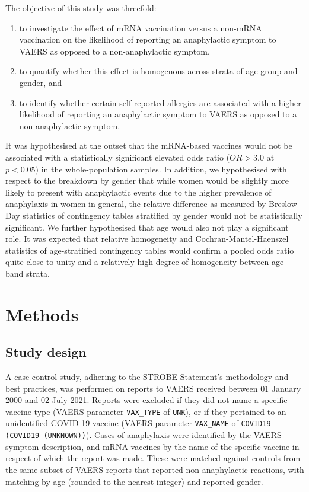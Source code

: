 \documentclass{article}
\begin{document}
The objective of this study was threefold:

\begin{enumerate}
    \item to investigate the effect of mRNA vaccination versus a non-mRNA vaccination on the likelihood of reporting an anaphylactic symptom to VAERS as opposed to a non-anaphylactic symptom,
    \item to quantify whether this effect is homogenous across strata of age group and gender, and
    \item to identify whether certain self-reported allergies are associated with a higher likelihood of reporting an anaphylactic symptom to VAERS as opposed to a non-anaphylactic symptom.
\end{enumerate}

It was hypothesised at the outset that the mRNA-based vaccines would not be associated with a statistically significant elevated odds ratio ($OR > 3.0$ at $p < 0.05$) in the whole-population samples.
In addition, we hypothesised with respect to the breakdown by gender that while women would be slightly more likely to present with anaphylactic events due to the higher prevalence of anaphylaxis in women in general,\cite{salvati2019gender} the relative difference as measured by Breslow-Day statistics of contingency tables stratified by gender would not be statistically significant.
We further hypothesised that age would also not play a significant role.
It was expected that relative homogeneity and Cochran-Mantel-Haenszel statistics of age-stratified contingency tables would confirm a pooled odds ratio quite close to unity and a relatively high degree of homogeneity between age band strata.


\section{Methods}

\subsection{Study design}

A case-control study, adhering to the STROBE Statement's methodology and best practices,\cite{von2014strengthening} was performed on reports to VAERS received between 01 January 2000 and 02 July 2021.
Reports were excluded if they did not name a specific vaccine type (VAERS parameter \texttt{VAX\_TYPE} of \texttt{UNK}), or if they pertained to an unidentified COVID-19 vaccine (VAERS parameter \texttt{VAX\_NAME} of \texttt{COVID19 (COVID19 (UNKNOWN))}).
Cases of anaphylaxis were identified by the VAERS symptom description, and mRNA vaccines by the name of the specific vaccine in respect of which the report was made.
These were matched against controls from the same subset of VAERS reports that reported non-anaphylactic reactions, with matching by age (rounded to the nearest integer) and reported gender.
\end{document}

